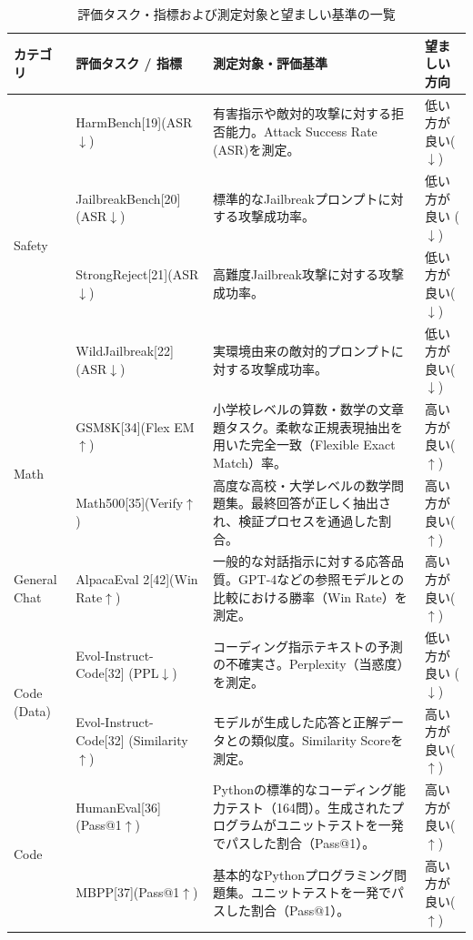 \documentclass{article}
\begin{document}
\newpage
\begin{table}[htbp]
\centering
\caption{評価タスク・指標および測定対象と望ましい基準の一覧}
\label{tab:evaluation_metrics_1}
\small
\begin{tabularx}{\textwidth}{p{2.0cm}p{3.3cm}Xp{2.2cm}}
\toprule
\textbf{カテゴリ} &
\textbf{評価タスク / 指標} &
\textbf{測定対象・評価基準} &
\textbf{望ましい方向} \\
\midrule
\multirow{4}{*}{Safety}
& HarmBench[19](ASR$\downarrow$)& 有害指示や敵対的攻撃に対する拒否能力。Attack Success Rate (ASR)を測定。 & 低い方が良い($\downarrow$) \\
& JailbreakBench[20](ASR$\downarrow$) & 標準的なJailbreakプロンプトに対する攻撃成功率。& 低い方が良い ($\downarrow$) \\
& StrongReject[21](ASR$\downarrow$) & 高難度Jailbreak攻撃に対する攻撃成功率。 & 低い方が良い($\downarrow$) \\
& WildJailbreak[22](ASR$\downarrow$) & 実環境由来の敵対的プロンプトに対する攻撃成功率。 & 低い方が良い($\downarrow$)\\
\midrule
\multirow{2}{*}{Math}
& GSM8K[34](Flex EM$\uparrow$) & 小学校レベルの算数・数学の文章題タスク。柔軟な正規表現抽出を用いた完全一致（Flexible Exact Match）率。 & 高い方が良い($\uparrow$) \\
& Math500[35](Verify$\uparrow$) & 高度な高校・大学レベルの数学問題集。最終回答が正しく抽出され、検証プロセスを通過した割合。 & 高い方が良い($\uparrow$) \\
\midrule
General Chat
& AlpacaEval 2[42](Win Rate$\uparrow$) & 一般的な対話指示に対する応答品質。GPT-4などの参照モデルとの比較における勝率（Win Rate）を測定。 & 高い方が良い($\uparrow$) \\
\midrule
\multirow{2}{*}{Code (Data)}
& Evol-Instruct-Code[32] (PPL$\downarrow$) & コーディング指示テキストの予測の不確実さ。Perplexity（当惑度）を測定。 & 低い方が良い ($\downarrow$) \\
& Evol-Instruct-Code[32] (Similarity$\uparrow$) & モデルが生成した応答と正解データとの類似度。Similarity Scoreを測定。 & 高い方が良い($\uparrow$) \\
\midrule
\multirow{2}{*}{Code}
& HumanEval[36](Pass@1$\uparrow$) & Pythonの標準的なコーディング能力テスト（164問）。生成されたプログラムがユニットテストを一発でパスした割合（Pass@1）。 & 高い方が良い($\uparrow$) \\
& MBPP[37](Pass@1$\uparrow$) & 基本的なPythonプログラミング問題集。ユニットテストを一発でパスした割合（Pass@1）。 & 高い方が良い($\uparrow$) \\

\end{tabularx}
\end{table}
\end{document}
